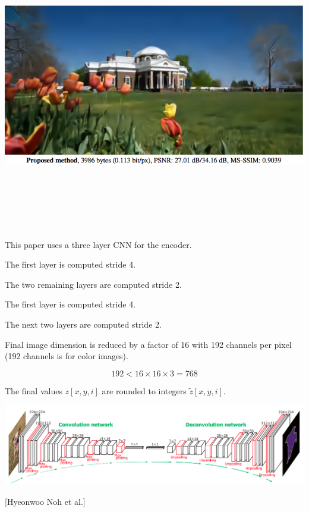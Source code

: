 {

\bigskip
\centerline{\includegraphics[height = 5in]{../images/RateDist4}}


This paper uses a three layer CNN for the encoder.

\vfill
The first layer is computed stride 4.

\vfill
The two remaining layers are computed stride 2.


\vfill
The first layer is computed stride 4.

\vfill
The next two layers are computed stride 2.

\vfill
Final image dimension is reduced by a factor of 16 with 192 channels per pixel (192 channels is for color images).

\vfill
$$192 < 16 \times 16 \times 3 = 768$$

\vfill
The final values $z[x,y,i]$ are rounded to integers $\tilde{z}[x,y,i]$.


\centerline{\includegraphics[width=9in]{../images/Deconv}}
\centerline{[Hyeonwoo Noh et al.]}

}
